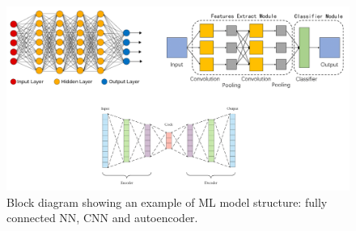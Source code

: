 \documentclass[12pt]{report}
\begin{document}
\begin{figure}[h!]
    \centering
    \includegraphics[width=140mm]{Figures/Chapter1/structures.png} 
    \caption{Block diagram showing an example of ML model structure: fully connected NN, CNN and autoencoder.}
    \label{fig:structures}    
\end{figure}  
\end{document}
